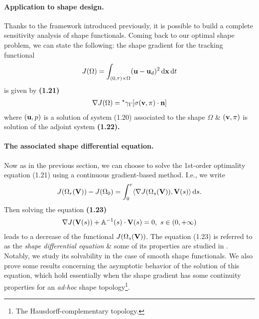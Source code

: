 \documentclass[oneside]{book}
\numberwithin{equation}{section}
\begin{document}
\paragraph{Application to shape design.} Thanks to the framework introduced previously, it is possible to build a complete sensitivity analysis of shape functionals. Coming back to our optimal shape problem, we can state the following: the shape gradient for the tracking functional
\begin{align*}
	J(\Omega) = \int_{(0,\tau)\times\Omega} ({\bf u} - {\bf u}_d)^2\,{\rm d}{\bf x}\,{\rm d}t
\end{align*}
is given by \textbf{(1.21)}
\begin{align*}
	\nabla J(\Omega) = {}^\star\gamma_\Gamma[\sigma({\bf v},\pi)\cdot{\bf n}]
\end{align*}
where $({\bf u},p)$ is a solution of system (1.20) associated to the shape $\Omega$ \& $({\bf v},\pi)$ is solution of the adjoint system \textbf{(1.22).}

\paragraph{The associated shape differential equation.} Now as in the previous section, we can choose to solve the 1st-order optimality equation (1.21) using a continuous gradient-based method. I.e., we write
\begin{align*}
	J(\Omega_r({\bf V})) - J(\Omega_0) = \int_0^r \langle\nabla J(\Omega_s({\bf V})),{\bf V}(s)\rangle\,{\rm d}s.
\end{align*}
Then solving the equation \textbf{(1.23)}
\begin{align*}
	\nabla J({\bf V}(s)) + \mathbb{A}^{-1}(s)\cdot{\bf V}(s) = 0,\ s\in(0,+\infty)
\end{align*}
leads to a decrease of the functional $J(\Omega_s({\bf V}))$. The equation (1.23) is referred to as the \textit{shape differential equation} \& some of its properties are studied in \cite[Chap. 4]{Moubachir_Zolesio2006}. Notably, we study its solvability in the case of smooth shape functionals. We also prove some results concerning the asymptotic behavior of the solution of this equation, which hold essentially when the shape gradient has some continuity properties for an \textit{ad-hoc} shape topology\footnote{The Hausdorff-complementary topology.}.
\end{document}
